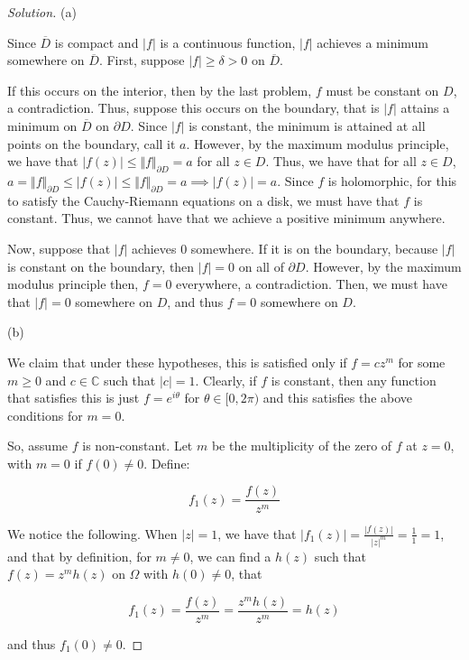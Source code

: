 \documentclass[10pt]{article}
\begin{document}
\begin{proof}[Solution]

(a)

Since $\overline{D}$ is compact and $|f|$ is a continuous function, $|f|$ achieves a minimum somewhere on $\overline{D}$. First, suppose $|f| \geq \delta > 0$ on $\overline{D}$.

If this occurs on the interior, then by the last problem, $f$ must be constant on $D$, a contradiction. Thus, suppose this occurs on the boundary, that is $|f|$ attains a minimum on $\overline{D}$ on $\partial D$. Since $|f|$ is constant, the minimum is attained at all points on the boundary, call it $a$. However, by the maximum modulus principle, we have that $|f(z)| \leq \Vert f \Vert_{\partial D} = a$ for all $z \in D$. Thus, we have that for all $z \in D$, $a = \Vert f \Vert_{\partial D} \leq |f(z)| \leq \Vert f \Vert_{\partial D} = a \implies |f(z)| = a$. Since $f$ is holomorphic, for this to satisfy the Cauchy-Riemann equations on a disk, we must have that $f$ is constant. Thus, we cannot have that we achieve a positive minimum anywhere.

Now, suppose that $|f|$ achieves 0 somewhere. If it is on the boundary, because $|f|$ is constant on the boundary, then $|f| = 0$ on all of $\partial D$. However, by the maximum modulus principle then, $f = 0$ everywhere, a contradiction. Then, we must have that $|f| = 0$ somewhere on $D$, and thus $f = 0$ somewhere on $D$.

(b)

We claim that under these hypotheses, this is satisfied only if $f = cz^m$ for some $m \geq 0$ and $c \in \mathbb{C}$ such that $|c| = 1$. Clearly, if $f$ is constant, then any function that satisfies this is just $f = e^{i \theta}$ for $\theta \in [0,2\pi)$ and this satisfies the above conditions for $m = 0$. 

So, assume $f$ is non-constant. Let $m$ be the multiplicity of the zero of $f$ at $z = 0$, with $m = 0$ if $f(0) \not = 0$. Define:

$$f_1(z) = \frac{f(z)}{z^m}$$

We notice the following. When $|z| = 1$, we have that $|f_1(z)| = \frac{|f(z)|}{|z|^m} = \frac{1}{1} = 1$, and that by definition, for $m \not = 0$, we can find a $h(z)$ such that $f(z) = z^m h(z)$ on $\Omega$ with $h(0) \not = 0$, that

$$f_1(z) = \frac{f(z)}{z^m} = \frac{z^m h(z)}{z^m} = h(z)$$

and thus $f_1(0) \not = 0$.


\end{proof}
\end{document}
